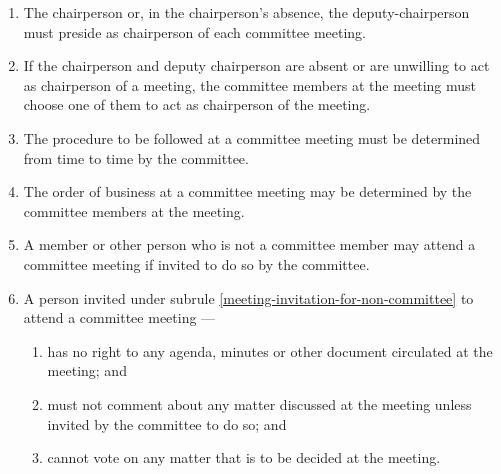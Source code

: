 \documentclass[../constitution.tex]{subfiles}
\begin{document}
\begin{enumerate}

  \item The chairperson or, in the chairperson's absence, the deputy-chairperson must preside as chairperson of each committee meeting.
  \item If the chairperson and deputy chairperson are absent or are unwilling to act as chairperson of a meeting, the committee members at the meeting must choose one of them to act as chairperson of the meeting.
  \item The procedure to be followed at a committee meeting must be determined from time to time by the committee.
  \item The order of business at a committee meeting may be determined by the committee members at the meeting.
  \item A member or other person who is not a committee member may attend a committee meeting if invited to do so by the committee. \label{meeting-invitation-for-non-committee}
  \item A person invited under subrule \ref{meeting-invitation-for-non-committee} to attend a committee meeting ---

        \begin{enumerate}

          \item has no right to any agenda, minutes or other document circulated at the meeting; and
          \item must not comment about any matter discussed at the meeting unless invited by the committee to do so; and
          \item cannot vote on any matter that is to be decided at the meeting.
        \end{enumerate}
\end{enumerate}
\end{document}
